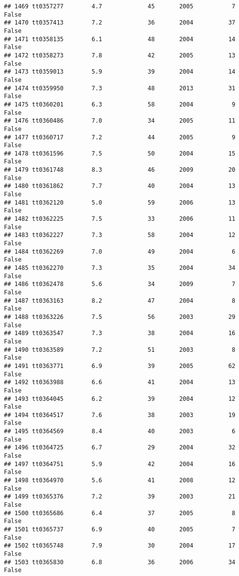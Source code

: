 \documentclass[
]{article}
\begin{document}
\begin{verbatim}
## 1469 tt0357277        4.7             45       2005           7   False
## 1470 tt0357413        7.2             36       2004          37   False
## 1471 tt0358135        6.1             48       2004          14   False
## 1472 tt0358273        7.8             42       2005          13   False
## 1473 tt0359013        5.9             39       2004          14   False
## 1474 tt0359950        7.3             48       2013          31   False
## 1475 tt0360201        6.3             58       2004           9   False
## 1476 tt0360486        7.0             34       2005          11   False
## 1477 tt0360717        7.2             44       2005           9   False
## 1478 tt0361596        7.5             50       2004          15   False
## 1479 tt0361748        8.3             46       2009          20   False
## 1480 tt0361862        7.7             40       2004          13   False
## 1481 tt0362120        5.0             59       2006          13   False
## 1482 tt0362225        7.5             33       2006          11   False
## 1483 tt0362227        7.3             58       2004          12   False
## 1484 tt0362269        7.0             49       2004           6   False
## 1485 tt0362270        7.3             35       2004          34   False
## 1486 tt0362478        5.6             34       2009           7   False
## 1487 tt0363163        8.2             47       2004           8   False
## 1488 tt0363226        7.5             56       2003          29   False
## 1489 tt0363547        7.3             38       2004          16   False
## 1490 tt0363589        7.2             51       2003           8   False
## 1491 tt0363771        6.9             39       2005          62   False
## 1492 tt0363988        6.6             41       2004          13   False
## 1493 tt0364045        6.2             39       2004          12   False
## 1494 tt0364517        7.6             38       2003          19   False
## 1495 tt0364569        8.4             40       2003           6   False
## 1496 tt0364725        6.7             29       2004          32   False
## 1497 tt0364751        5.9             42       2004          16   False
## 1498 tt0364970        5.6             41       2008          12   False
## 1499 tt0365376        7.2             39       2003          21   False
## 1500 tt0365686        6.4             37       2005           8   False
## 1501 tt0365737        6.9             40       2005           7   False
## 1502 tt0365748        7.9             30       2004          17   False
## 1503 tt0365830        6.8             36       2006          34   False

\end{verbatim}
\end{document}
